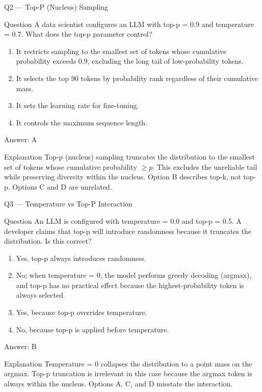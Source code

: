\documentclass[aspectratio=169,8pt]{beamer}
\begin{document}
	\begin{frame}{Q2 --- Top-P (Nucleus) Sampling}
		\begin{block}{Question}
			A data scientist configures an LLM with top-p = 0.9 and temperature = 0.7. What does the top-p parameter control?
			\begin{enumerate}
				\item It restricts sampling to the smallest set of tokens whose cumulative probability exceeds 0.9, excluding the long tail of low-probability tokens.
				\item It selects the top 90 tokens by probability rank regardless of their cumulative mass.
				\item It sets the learning rate for fine-tuning.
				\item It controls the maximum sequence length.
			\end{enumerate}
		\end{block}
		\begin{exampleblock}{Answer: A}\end{exampleblock}
		\begin{block}{Explanation}
			Top-p (nucleus) sampling truncates the distribution to the smallest set of tokens whose cumulative probability $\geq p$. This excludes the unreliable tail while preserving diversity within the nucleus. Option B describes top-k, not top-p. Options C and D are unrelated.
		\end{block}
	\end{frame}
	
	\begin{frame}{Q3 --- Temperature vs Top-P Interaction}
		\begin{block}{Question}
			An LLM is configured with temperature = 0.0 and top-p = 0.5. A developer claims that top-p will introduce randomness because it truncates the distribution. Is this correct?
			\begin{enumerate}
				\item Yes, top-p always introduces randomness.
				\item No; when temperature = 0, the model performs greedy decoding (argmax), and top-p has no practical effect because the highest-probability token is always selected.
				\item Yes, because top-p overrides temperature.
				\item No, because top-p is applied before temperature.
			\end{enumerate}
		\end{block}
		\begin{exampleblock}{Answer: B}\end{exampleblock}
		\begin{block}{Explanation}
			Temperature = 0 collapses the distribution to a point mass on the argmax. Top-p truncation is irrelevant in this case because the argmax token is always within the nucleus. Options A, C, and D misstate the interaction.
		\end{block}
	\end{frame}
	
\end{document}
